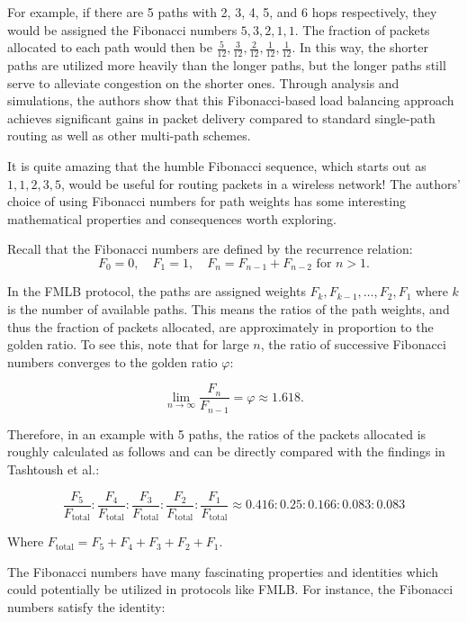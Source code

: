 \documentclass[12pt]{article}
\begin{document}
For example, if there are 5 paths with 2, 3, 4, 5, and 6 hops respectively, they would be assigned the Fibonacci numbers $5, 3, 2, 1, 1$. The fraction of packets allocated to each path would then be $\frac{5}{12}, \frac{3}{12}, \frac{2}{12}, \frac{1}{12}, \frac{1}{12}$. In this way, the shorter paths are utilized more heavily than the longer paths, but the longer paths still serve to alleviate congestion on the shorter ones. Through analysis and simulations, the authors show that this Fibonacci-based load balancing approach achieves significant gains in packet delivery compared to standard single-path routing as well as other multi-path schemes.

It is quite amazing that the humble Fibonacci sequence, which starts out as $1, 1, 2, 3, 5$, would be useful for routing packets in a wireless network! The authors' choice of using Fibonacci numbers for path weights has some interesting mathematical properties and consequences worth exploring.

Recall that the Fibonacci numbers are defined by the recurrence relation:
\begin{equation}
F_0 = 0, \quad F_1 = 1, \quad F_n = F_{n-1} + F_{n-2} \text{ for } n > 1.
\end{equation}

In the FMLB protocol, the paths are assigned weights $F_k, F_{k-1}, \ldots, F_2, F_1$ where $k$ is the number of available paths. This means the ratios of the path weights, and thus the fraction of packets allocated, are approximately in proportion to the golden ratio. To see this, note that for large $n$, the ratio of successive Fibonacci numbers converges to the golden ratio $\varphi$:

\begin{equation}
\lim_{n \to \infty} \frac{F_n}{F_{n-1}} = \varphi \approx 1.618.
\end{equation}

Therefore, in an example with 5 paths, the ratios of the packets allocated is roughly calculated as follows and can be directly compared with the findings in Tashtoush et al.:

\[
\frac{F_5}{F_{\text{total}}} : \frac{F_4}{F_{\text{total}}} : \frac{F_3}{F_{\text{total}}} : \frac{F_2}{F_{\text{total}}} : \frac{F_1}{F_{\text{total}}} \approx 0.416 : 0.25 : 0.166 : 0.083 : 0.083
\]

Where $F_{\text{total}} = F_5 + F_4 + F_3 + F_2 + F_1$.

The Fibonacci numbers have many fascinating properties and identities which could potentially be utilized in protocols like FMLB. For instance, the Fibonacci numbers satisfy the identity:
\end{document}
